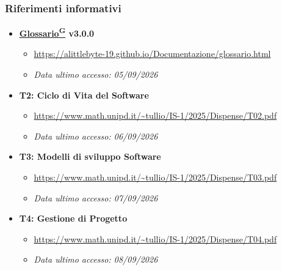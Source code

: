 \documentclass[a4paper,12pt]{article}
\providecommand{\glslink}[2]{\href{https://alittlebyte-19.github.io/Documentazione/glossario.html\#gls-#1}{\underline{#2}\textsuperscript{\scriptsize G}}}
\begin{document}
\subsubsection{Riferimenti informativi}
\begin{itemize}
    \item \textbf{\glslink{glossario}{Glossario} v3.0.0}
    \begin{itemize}
        \item \url{https://alittlebyte-19.github.io/Documentazione/glossario.html}
        \item \textit{Data ultimo accesso: 05/09/2026}
    \end{itemize}
    \item \textbf{T2: Ciclo di Vita del Software}
    \begin{itemize}
        \item \url{https://www.math.unipd.it/~tullio/IS-1/2025/Dispense/T02.pdf}
        \item \textit{Data ultimo accesso: 06/09/2026}
    \end{itemize}
    \item \textbf{T3: Modelli di sviluppo Software}
    \begin{itemize}
        \item \url{https://www.math.unipd.it/~tullio/IS-1/2025/Dispense/T03.pdf}
        \item \textit{Data ultimo accesso: 07/09/2026}
    \end{itemize}
    \item \textbf{T4: Gestione di Progetto}
    \begin{itemize}
        \item \url{https://www.math.unipd.it/~tullio/IS-1/2025/Dispense/T04.pdf}
        \item \textit{Data ultimo accesso: 08/09/2026}
    \end{itemize}
\end{itemize}
\end{document}
